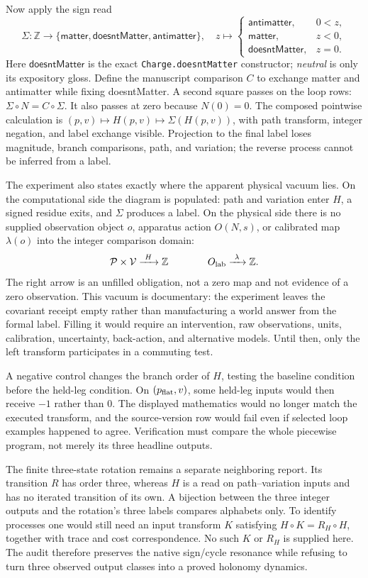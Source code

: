 Now apply the sign read
\[
 \Sigma:\mathbb Z\to\{\mathsf{matter},\mathsf{doesntMatter},\mathsf{antimatter}\},
\quad z\mapsto
 \begin{cases}
 \mathsf{antimatter},&0<z,\\
 \mathsf{matter},&z<0,\\
 \mathsf{doesntMatter},&z=0.
 \end{cases}
\]
Here \(\mathsf{doesntMatter}\) is the exact \texttt{Charge.doesntMatter} constructor; \emph{neutral} is only its
expository gloss.  Define the manuscript comparison \(C\) to exchange matter and antimatter while fixing
doesntMatter.  A second square passes on the loop rows:
\(\Sigma\circ N=C\circ\Sigma\).  It also passes at zero because \(N(0)=0\).  The composed pointwise calculation is
\((p,v)\mapsto H(p,v)\mapsto\Sigma(H(p,v))\), with path transform, integer negation, and label exchange visible.
Projection to the final label loses magnitude, branch comparisons, path, and variation; the reverse process cannot
be inferred from a label.

The experiment also states exactly where the apparent physical vacuum lies.  On the computational side the diagram
is populated: path and variation enter \(H\), a signed residue exits, and \(\Sigma\) produces a label.  On the physical
side there is no supplied observation object \(o\), apparatus action \(O(N,s)\), or calibrated map
\(\lambda(o)\) into the integer comparison domain:
\[
 \mathcal P\times\mathcal V\xrightarrow{\ H\ }\mathbb Z
 \qquad\qquad
 O_{\rm lab}\xrightarrow{\ \lambda\ }\mathbb Z.
\]
The right arrow is an unfilled obligation, not a zero map and not evidence of a zero observation.  This vacuum is
documentary: the experiment leaves the covariant receipt empty rather than manufacturing a world answer from the
formal label.  Filling it would require an intervention, raw observations, units, calibration, uncertainty,
back-action, and alternative models.  Until then, only the left transform participates in a commuting test.

A negative control changes the branch order of \(H\), testing the baseline condition before the held-leg condition.
On \((p_{\rm flat},v)\), some held-leg inputs would then receive \(-1\) rather than \(0\).  The displayed mathematics
would no longer match the executed transform, and the source-version row would fail even if selected loop examples
happened to agree.  Verification must compare the whole piecewise program, not merely its three headline outputs.

The finite three-state rotation remains a separate neighboring report.  Its transition \(R\) has order three, whereas
\(H\) is a read on path--variation inputs and has no iterated transition of its own.  A bijection between the three
integer outputs and the rotation's three labels compares alphabets only.  To identify processes one would still need
an input transform \(K\) satisfying \(H\circ K=R_H\circ H\), together with trace and cost correspondence.  No such
\(K\) or \(R_H\) is supplied here.  The audit therefore preserves the native sign/cycle resonance while refusing to
turn three observed output classes into a proved holonomy dynamics.

